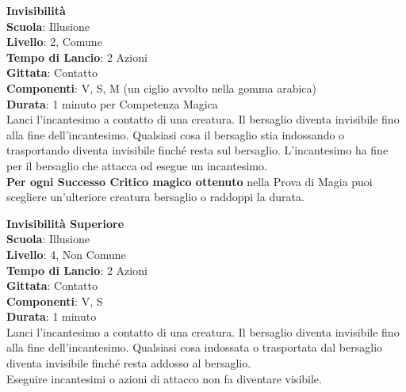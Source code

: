 \begin{multicols}{2}
\medskip\textbf{Invisibilità}\\
\textbf{Scuola}: Illusione\\
\textbf{Livello}: 2, Comune\\
\textbf{Tempo di Lancio}: 2 Azioni\\
\textbf{Gittata}: Contatto\\
\textbf{Componenti}: V, S, M (un ciglio avvolto nella gomma arabica)\\
\textbf{Durata}: 1 minuto per Competenza Magica\\
Lanci l'incantesimo a contatto di una creatura. Il bersaglio diventa invisibile fino alla fine dell'incantesimo. Qualsiasi cosa il bersaglio stia indossando o trasportando diventa invisibile finché resta sul bersaglio. L'incantesimo ha fine per il bersaglio che attacca od esegue un incantesimo.\\
\textbf{Per ogni Successo Critico magico ottenuto} nella Prova di Magia puoi scegliere un'ulteriore creatura bersaglio o raddoppi la durata.

\medskip\textbf{Invisibilità Superiore}\\
\textbf{Scuola}: Illusione\\
\textbf{Livello}: 4, Non Comune\\
\textbf{Tempo di Lancio}: 2 Azioni\\
\textbf{Gittata}: Contatto\\
\textbf{Componenti}: V, S\\
\textbf{Durata}: 1 minuto\\
Lanci l'incantesimo a contatto di una creatura. Il bersaglio diventa invisibile fino alla fine dell'incantesimo. Qualsiasi cosa indossata o trasportata dal bersaglio diventa invisibile finché resta addosso al bersaglio.\\
Eseguire incantesimi o azioni di attacco non fa diventare visibile.


\end{multicols}
